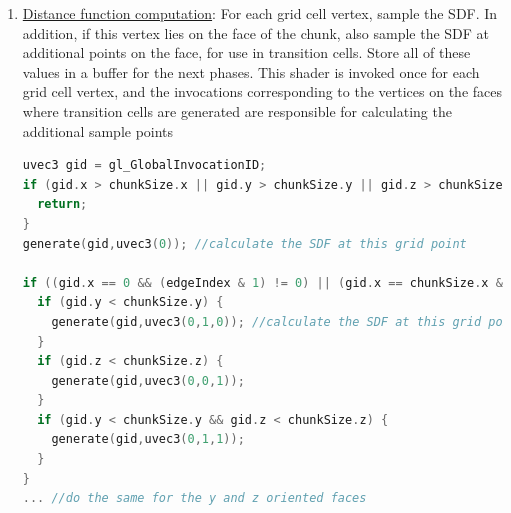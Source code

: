 \documentclass{article}
\begin{document}
\begin{enumerate}
\item \underline{Distance function computation}: For each grid cell vertex, sample the SDF. In addition, if this vertex lies on the face of the chunk, also sample the SDF at additional points on the face, for use in transition cells. Store all of these values in a buffer for the next phases. This shader is invoked once for each grid cell vertex, and the invocations corresponding to the vertices on the faces where transition cells are generated are responsible for calculating the additional sample points

\begin{lstlisting}[language=C++,label={tv_generate},caption={Part of the GLSL code responsible for sampling the SDF in the parallel Transvoxel algorithm. This code snippet samples the SDF at the actual grid point, as well as at points surrounding it on the -X and +X facing faces. Lines 7-17 are repeated for the remaining faces of the chunk. Figure \ref{fig:tv_gen_grid} demonstrates which sample points would be calculated in various invocations of this algorithm. The \texttt{generate} function takes 2 parameters: the first is the actual position of the grid cell vertex, and the second is an offset parameter, for generating sample values halfway beetween grid vertices. For example, a value of \texttt{uvec3(0,1,0)} corresponds to a point that is offset from the position in the first argument by half a grid cell in the Y direction.}]
uvec3 gid = gl_GlobalInvocationID;
if (gid.x > chunkSize.x || gid.y > chunkSize.y || gid.z > chunkSize.z) {
  return;
}
generate(gid,uvec3(0)); //calculate the SDF at this grid point

if ((gid.x == 0 && (edgeIndex & 1) != 0) || (gid.x == chunkSize.x && (edgeIndex & 2) != 0)) {
  if (gid.y < chunkSize.y) {
    generate(gid,uvec3(0,1,0)); //calculate the SDF at this grid point, offset by half the grid width in the y direction
  }
  if (gid.z < chunkSize.z) {
    generate(gid,uvec3(0,0,1));
  }
  if (gid.y < chunkSize.y && gid.z < chunkSize.z) {
    generate(gid,uvec3(0,1,1));
  }
}
... //do the same for the y and z oriented faces
\end{lstlisting}


\end{enumerate}
\end{document}
